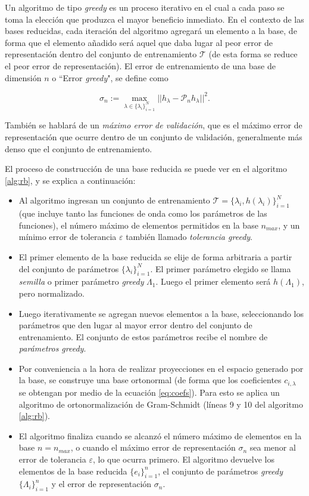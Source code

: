 Un algoritmo de tipo \textit{greedy} es un proceso iterativo en el cual a cada paso se toma la elección que produzca el mayor beneficio inmediato.
En el contexto de las bases reducidas, cada iteración del algoritmo agregará un elemento a la base, de forma que el elemento añadido será aquel que daba lugar al peor error de representación dentro del conjunto de entrenamiento $\mathcal{T}$ (de esta forma se reduce el peor error de representación). El error de entrenamiento de una base de dimensión $n$ o ``Error \textit{greedy}", se define como 

\begin{equation}
\sigma_n := \max_{\lambda \in  \{ \lambda_{i}\}_{i=1}^N } || h_{\lambda} - \mathcal{P}_nh_{\lambda} ||^2.
\end{equation}

También se hablará de un \textit{máximo error de validación}, que es el máximo error de representación que ocurre dentro de un conjunto de validación, generalmente más denso que el conjunto de entrenamiento.

El proceso de construcción de una base reducida se puede ver en el algoritmo \ref{alg:rb}, y se explica a continuación:

\begin{itemize}
\item Al algoritmo ingresan un conjunto de entrenamiento $\mathcal{T} = \{ \lambda_{i}, h(\lambda_i) \}_{i=1}^N$ (que incluye tanto las funciones de onda como los parámetros de las funciones), el número máximo de elementos permitidos en la base $n_{max}$, y un mínimo error de tolerancia $\varepsilon$ también llamado \textit{tolerancia greedy}.
\item El primer elemento de la base reducida se elije de forma arbitraria a partir del conjunto de parámetros $\{\lambda_{i}\}_{i=1}^N$. El primer parámetro elegido se llama \textit{semilla} o primer parámetro \textit{greedy} $\Lambda_1$. Luego el primer elemento será $h(\Lambda_1)$, pero normalizado.
\item Luego iterativamente se agregan nuevos elementos a la base, seleccionando los parámetros que den lugar al mayor error dentro del conjunto de entrenamiento. El conjunto de estos parámetros recibe el nombre de \textit{parámetros greedy}.
\item Por conveniencia a la hora de realizar proyecciones en el espacio generado por la base, se construye una base ortonormal (de forma que los coeficientes $c_{i,\lambda}$ se obtengan por medio de la ecuación \eqref{eq:coefs}). Para esto se aplica un algoritmo de ortonormalización de Gram-Schmidt (líneas 9 y 10 del algoritmo \ref{alg:rb}).
\item El algoritmo finaliza cuando se alcanzó el número máximo de elementos en la base $n = n_{max}$, o cuando el máximo error de representación $\sigma_n$ sea menor al error de tolerancia $\varepsilon$, lo que ocurra primero. El algoritmo devuelve los elementos de la base reducida $\{ e_i\}_{i=1}^{n}$, el conjunto de parámetros \textit{greedy} $\{\Lambda_i\}_{i=1}^{n}$ y el error de representación $\sigma_n$.
\end{itemize}

